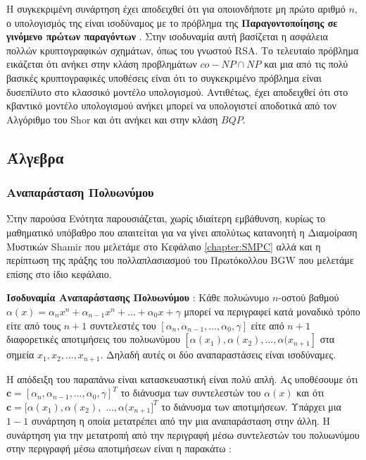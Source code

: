 Η συγκεκριμένη συνάρτηση έχει αποδειχθεί ότι για οποιονδήποτε μη πρώτο αριθμό $n$, ο υπολογισμός της είναι ισοδύναμος με το πρόβλημα της \textbf{Παραγοντοποίησης σε γινόμενο πρώτων παραγόντων} \cite{miller1976riemann}. Στην ισοδυναμία αυτή βασίζεται η ασφάλεια πολλών κρυπτογραφικών σχημάτων, όπως του γνωστού RSA. Το τελευταίο πρόβλημα εικάζεται ότι ανήκει στην κλάση προβλημάτων $co-NP \cap NP$ και μια από τις πολύ βασικές κρυπτογραφικές υποθέσεις είναι ότι το συγκεκριμένο πρόβλημα είναι δυσεπίλυτο στο κλασσικό μοντέλο υπολογισμού. Αντιθέτως, έχει αποδειχθεί ότι στο κβαντικό μοντέλο υπολογισμού ανήκει μπορεί να υπολογιστεί αποδοτικά από τον Αλγόριθμο του Shor και ότι ανήκει και στην κλάση $BQP$. 

\subsection{Άλγεβρα}

\subsubsection{Αναπαράσταση Πολυωνύμου}

Στην παρούσα Ενότητα παρουσιάζεται, χωρίς ιδιαίτερη εμβάθυνση, κυρίως το μαθηματικό υπόβαθρο που απαιτείται για να γίνει απολύτως κατανοητή η Διαμοίραση Μυστικών Shamir που μελετάμε στο Κεφάλαιο \ref{chapter:SMPC} αλλά και η περίπτωση της πράξης του πολλαπλασιασμού του Πρωτόκολλου BGW που μελετάμε επίσης στο ίδιο κεφάλαιο.

\begin{theorem}
\textbf{Ισοδυναμία Αναπαράστασης Πολυωνύμου} : Κάθε πολυώνυμο $n$-οστού βαθμού $α(x) = α_nx^n + α_{n-1}x^n + \ldots + α_0x + γ$ μπορεί να περιγραφεί κατά μοναδικό τρόπο είτε από τους $n+1$ συντελεστές του $[α_n, α_{n-1}, \ldots, α_0, γ]$ είτε από $n+1$ διαφορετικές αποτιμήσεις του πολυωνύμου $[α(x_1), α(x_2), \ldots, α(x_{n+1}]$ στα σημεία $x_1, x_2, \ldots, x_{n+1}$. Δηλαδή αυτές οι δύο αναπαραστάσεις είναι ισοδύναμες.
\end{theorem}

Η απόδειξη του παραπάνω είναι κατασκευαστική είναι πολύ απλή. Ας υποθέσουμε ότι $\mathbf{c} = [α_n, α_{n-1}, \ldots, α_0, γ]^T$ το διάνυσμα των συντελεστών του $α(x)$ και ότι $\mathbf{c} = [α(x_1), α(x_2),$ $\ldots, α(x_{n+1}]^T$ το διάνυσμα των αποτιμήσεων. Υπάρχει μια $1-1$ συνάρτηση η οποία μετατρέπει από την μια αναπαράσταση στην άλλη. H συνάρτηση για την μετατροπή από την περιγραφή μέσω συντελεστών του πολυωνύμου στην περιγραφή μέσω αποτιμήσεων είναι η παρακάτω :

